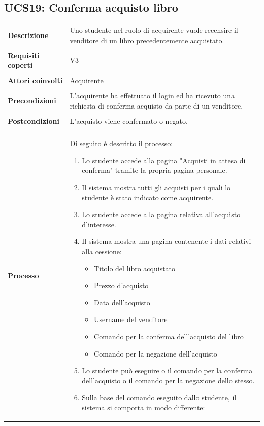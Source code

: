 \documentclass[10pt,a4paper]{report}
\begin{document}
	\subsection{UCS19: Conferma acquisto libro}
	\begin{tabular}{lp{}}
		\textbf{Descrizione}&Uno studente nel ruolo di acquirente vuole recensire il venditore di un libro precedentemente acquistato.\\
		\\
		\textbf{Requisiti coperti}&V3\\
		\\
		\textbf{Attori coinvolti}&Acquirente\\
		\\
		\textbf{Precondizioni}&L'acquirente ha effettuato il login ed ha ricevuto una richiesta di conferma acquisto da parte di un venditore.\\
		\\
		\textbf{Postcondizioni}&L'acquisto viene confermato o negato.\\
		\\
		\textbf{Processo}&Di seguito è descritto il processo:
		\begin{enumerate}
			\item Lo studente accede alla pagina "Acquisti in attesa di conferma" tramite la propria pagina personale.
			\item Il sistema mostra tutti gli acquisti per i quali lo studente è stato indicato come acquirente.
			\item Lo studente accede alla pagina relativa all'acquisto d'interesse.
			\item Il sistema mostra una pagina contenente i dati relativi alla cessione:
			\begin{itemize}
				\item Titolo del libro acquistato
				\item Prezzo d'acquisto
				\item Data dell'acquisto
				\item Username del venditore
				\item Comando per la conferma dell'acquisto del libro
				\item Comando per la negazione dell'acquisto
			\end{itemize}
			\item Lo studente può eseguire o il comando per la conferma dell'acquisto o il comando per la negazione dello stesso.
			\item Sulla base del comando eseguito dallo studente, il sistema si comporta in modo differente:

\end{enumerate}
\end{tabular}
\end{document}
